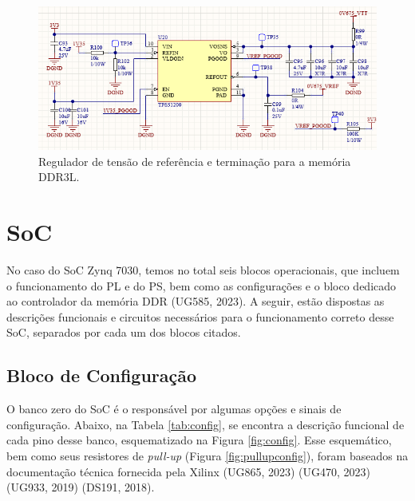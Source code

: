\begin{figure}[H]
    \centering
    \includegraphics[scale=0.8]{images/refsupp.png}
    \caption{Regulador de tensão de referência e terminação para a memória DDR3L.}
    \label{fig:1v35ref}
\end{figure}

\section{SoC}

No caso do SoC Zynq 7030, temos no total seis blocos operacionais, que incluem o funcionamento do PL e do PS, bem como as configurações e o bloco dedicado ao controlador da memória DDR (UG585, 2023). A seguir, estão dispostas as descrições funcionais e circuitos necessários para o funcionamento correto desse SoC, separados por cada um dos blocos citados.

\subsection{Bloco de Configuração}

O banco zero do SoC é o responsável por algumas opções e sinais de configuração. Abaixo, na Tabela \ref{tab:config}, se encontra a descrição funcional de cada pino desse banco, esquematizado na Figura \ref{fig:config}. Esse esquemático, bem como seus resistores de \textit{pull-up} (Figura \ref{fig:pullupconfig}), foram baseados na documentação técnica fornecida pela Xilinx (UG865, 2023) (UG470, 2023) (UG933, 2019) (DS191, 2018).


